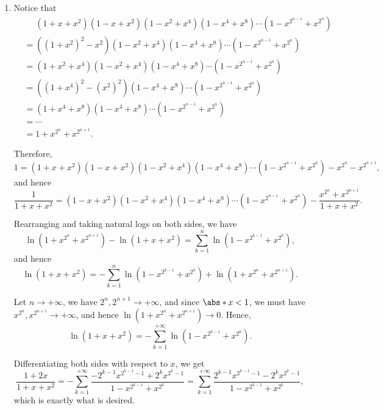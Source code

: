 \begin{enumerate}
    \item Notice that
          \begin{align*}
               & \phantom{=} (1 + x + x^2) (1 - x + x^2) (1 - x^2 + x^4) (1 - x^4 + x^8) \cdots (1 - x^{2^{n - 1}} + x^{2^n}) \\
               & = ((1 + x^2)^2 - x^2) (1 - x^2 + x^4) (1 - x^4 + x^8) \cdots (1 - x^{2^{n - 1}} + x^{2^n})                   \\
               & = (1 + x^2 + x^4) (1 - x^2 + x^4) (1 - x^4 + x^8) \cdots (1 - x^{2^{n - 1}} + x^{2^n})                       \\
               & = ((1 + x^4)^2 - (x^2)^2) (1 - x^4 + x^8) \cdots (1 - x^{2^{n - 1}} + x^{2^n})                               \\
               & = (1 + x^4 + x^8)(1 - x^4 + x^8) \cdots (1 - x^{2^{n - 1}} + x^{2^n})                                        \\
               & = \cdots                                                                                                     \\
               & = 1 + x^{2^n} + x^{2^{n + 1}}.
          \end{align*}

          Therefore,
          \[
              1 = (1 + x + x^2) (1 - x + x^2) (1 - x^2 + x^4) (1 - x^4 + x^8) \cdots (1 - x^{2^{n - 1}} + x^{2^n}) - x^{2^n} - x^{2^{n + 1}},
          \]
          and hence
          \[
              \frac{1}{1 + x + x^2} = (1 - x + x^2) (1 - x^2 + x^4) (1 - x^4 + x^8) \cdots (1 - x^{2^{n - 1}} + x^{2^n}) - \frac{x^{2^n} + x^{2^{n + 1}}}{1 + x + x^2}.
          \]

          Rearranging and taking natural logs on both sides, we have
          \[
              \ln(1 + x^{2^n} + x^{2^{n + 1}}) - \ln (1 + x + x^2) = \sum_{k = 1}^{n} \ln(1 - x^{2^{k - 1}} + x^{2^k}),
          \]
          and hence
          \[
              \ln (1 + x + x^2) = -\sum_{k = 1}^{n} \ln(1 - x^{2^{k - 1}} + x^{2^k}) + \ln(1 + x^{2^n} + x^{2^{n + 1}}).
          \]

          Let \(n \to +\infty\), we have \(2^n, 2^{n + 1} \to +\infty\), and since \(\abs*{x} < 1\), we must have \(x^{2^n}, x^{2^{n + 1}} \to +\infty\), and hence \(\ln(1 + x^{2^n} + x^{2^{n + 1}}) \to 0\). Hence,
          \[
              \ln (1 + x + x^2) = - \sum_{k = 1}^{+\infty} \ln(1 - x^{2^{k - 1}} + x^{2^k}).
          \]

          Differentiating both sides with respect to \(x\), we get
          \[
              \frac{1 + 2x}{1 + x + x^2} = - \sum_{k = 1}^{+\infty} \frac{- 2^{k - 1} x^{2^{k - 1} - 1} + 2^{k} x^{2^{k} - 1} }{1 - x^{2^{k - 1}} + x^{2^k}} = \sum_{k = 1}^{+\infty} \frac{2^{k - 1} x^{2^{k - 1} - 1} - 2^{k} x^{2^{k} - 1} }{1 - x^{2^{k - 1}} + x^{2^k}},
          \]
          which is exactly what is desired.
\end{enumerate}